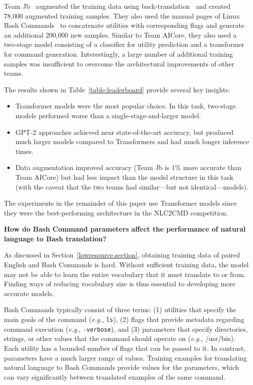 \documentclass{river-journal}
\begin{document}
Team Jb~\cite{Agarwal2021NeurIPS2N} augmented the training data using back-translation~\cite{Alzantot2018GeneratingNL} and created 78,000 augmented training samples. They also used the manual pages of Linux Bash Commands~\cite{Linux2018} to concatenate utilities with corresponding flags and generate an additional 200,000 new samples. Similar to Team AICore, they also used a two-stage model consisting of a classifier for utility prediction and a transformer for command generation. Interestingly, a large number of additional training samples was insufficient to overcome the architectural improvements of other teams. 

The results shown in Table~\ref{table:leaderboard} provide several key insights:
\begin{itemize}
\item Transformer models were the most popular choice. In this task, two-stage models performed worse than a single-stage-and-larger model.

\item GPT-2 approaches achieved near state-of-the-art accuracy, but produced much larger models compared to Transformers and had much longer inference times.

\item Data augmentation improved accuracy (Team Jb is 1\% more accurate than Team AICore) but had less impact than the model structure in this task (with the caveat that the two teams had similar---but not identical---models).
\end{itemize}
The experiments in the remainder of this paper use Transformer models since they were the best-performing architecture in the NLC2CMD competition.

\textbf{How do Bash Command parameters affect the performance of natural language to Bash translation?} 

As discussed in Section~\ref{lowresource.section}, obtaining training data of paired English and Bash Commands is hard. Without sufficient training data, the model may not be able to learn the entire vocabulary that it must translate to or from. Finding ways of reducing vocabulary size is thus essential to developing more accurate models.

Bash Commands typically consist of three terms: (1) utilities that specify the main goals of the command ({\em e.g.}, \texttt{ls}), (2) flags that provide metadata regarding command execution ({\em e.g.}, \texttt{-verbose}), and (3) parameters that specify directories, strings, or other values that the command should operate on ({\em e.g.}, /usr/bin). Each utility has a bounded number of flags that can be passed to it. In contrast, parameters have a much larger range of values. Training examples for translating natural language to Bash Commands provide values for the parameters, which can vary significantly between translated examples of the same command. 
\end{document}
